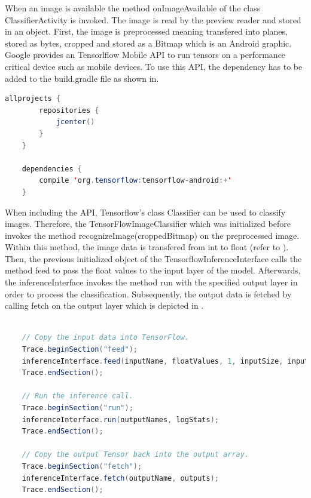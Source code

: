 When an image is available the method onImageAvailable of the class ClassifierActivity is invoked. The image is read by the preview reader and stored in an object. First, the image is preprocessed meaning transfered into planes, stored as bytes, cropped and stored as a Bitmap which is an Android graphic. Google provides an Tensorlflow Mobile API to run tensors on a performance critical device such as mobile devices. To use this API, the dependency has to be added to the build.gradle file as shown in. 

\begin{lstlisting}[caption=Tensorflow API in build.gradle, label=list:tensorflow_api, language=java]
	allprojects {
  		repositories {
        	jcenter()
    	}
	}

	dependencies {
    	compile 'org.tensorflow:tensorflow-android:+'
	}
\end{lstlisting}

When including the API, Tensorflow's class Classifier can be used to classify images. Therefore, the TensorFlowImageClassifier which was initialized before invokes the method recognizeImage(croppedBitmap) on the preprocessed image. Within this method, the image data is transfered from int to float (refer to ). Then, the previous initialized object of the TensorflowInferenceInterface calls the method feed to pass the float values to the input layer of the model. Afterwards, the inferenceInterface invokes the method run with the specified output layer in order to process the classification. Subsequently, the output data is fetched by calling fetch on the output layer which is depicted in .

\begin{lstlisting}[caption=Classifying images by the inferenceInterface, label=list:classify_android, language=java]

    // Copy the input data into TensorFlow.
    Trace.beginSection("feed");
    inferenceInterface.feed(inputName, floatValues, 1, inputSize, inputSize, 3);
    Trace.endSection();

    // Run the inference call.
    Trace.beginSection("run");
    inferenceInterface.run(outputNames, logStats);
    Trace.endSection();

    // Copy the output Tensor back into the output array.
    Trace.beginSection("fetch");
    inferenceInterface.fetch(outputName, outputs);
    Trace.endSection();
\end{lstlisting}


